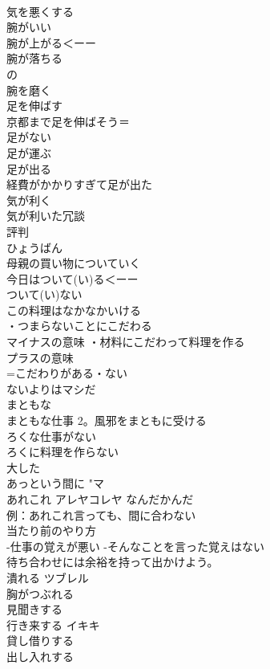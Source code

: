 \documentclass[8pt]{extreport}
\begin{document}
\begin{CJK}{UTF8}{min}
\\	気を悪くする	
\\	腕がいい	
\\	腕が上がる＜ーー
\\	腕が落ちる	
\\	の
\\	腕を磨く	
\\	足を伸ばす	
\\	京都まで足を伸ばそう＝
\\	足がない	
\\	足が運ぶ	
\\	足が出る	
\\	経費がかかりすぎて足が出た
\\	気が利く	
\\	気が利いた冗談
\\	評判	
\\	ひょうばん
\\	母親の買い物についていく	
\\	今日はついて(い)る＜ーー
\\	ついて(い)ない	
\\	この料理はなかなかいける	
\\	・つまらないことにこだわる
\\	マイナスの意味 ・材料にこだわって料理を作る
\\	プラスの意味	
\\	=こだわりがある・ない
\\	ないよりはマシだ	
\\	まともな	
\\	まともな仕事 2。風邪をまともに受ける　
\\	ろくな仕事がない	
\\	ろくに料理を作らない	
\\	大した	
\\	あっという間に	"マ 
\\	あれこれ アレヤコレヤ なんだかんだ	
\\	例：あれこれ言っても、間に合わない
\\	当たり前のやり方	
\\	-仕事の覚えが悪い -そんなことを言った覚えはない	
\\	待ち合わせには余裕を持って出かけよう。	
\\	潰れる	ツブレル 
\\	胸がつぶれる 
\\	見聞きする	
\\	行き来する	イキキ 
\\	貸し借りする	
\\	出し入れする	

\end{CJK}
\end{document}
